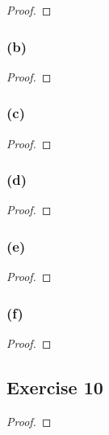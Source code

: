 \documentclass[14pt]{extarticle}
\begin{document}
\begin{proof}

\end{proof}

\subsubsection{(b)}

\begin{proof}

\end{proof}

\subsubsection{(c)}

\begin{proof}

\end{proof}

\subsubsection{(d)}

\begin{proof}

\end{proof}

\subsubsection{(e)}

\begin{proof}

\end{proof}

\subsubsection{(f)}

\begin{proof}

\end{proof}

\subsection{Exercise 10}

\begin{proof}

\end{proof}
\end{document}

